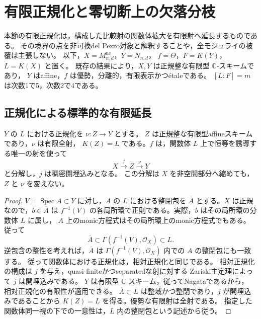 \section{有限正規化と零切断上の欠落分枝}
\label{sec:finite-normalization-boundary}

本節の有限正規化は，構成した比較射の関数体拡大を有限射へ延長するものである。
その境界の点を非可換del Pezzo対象と解釈することや，全モジュライの被覆は主張しない。
以下，$X=M^{\mathrm{nc}}_{n,d}$，$Y=N_{n,d}$，
$f=\overline\Theta$，$F=K(Y)$，$L=K(X)$ と置く。
既存の結果により，$X,Y$ は正規整な有限型 $\mathbb C$-スキームであり，
$Y$ はaffine，$f$ は優勢，分離的，有限表示かつ\'{e}taleである。
$[L:F]=m$ は次数1で5，次数2で4である。

\subsection{正規化による標準的な有限延長}

\begin{proposition}[有限正規化への開埋込み]
\label{prop:finite-normalization-open}
$Y$ の $L$ における正規化を $\nu:Z\to Y$ とする。
$Z$ は正規整な有限型affineスキームであり，$\nu$ は有限全射，
$K(Z)=L$ である。$f$ は，関数体 $L$ 上で恒等を誘導する唯一の射を使って
\[
 X\xrightarrow{\ j\ }Z\xrightarrow{\ \nu\ }Y
\]
と分解し，$j$ は稠密開埋込みとなる。
この分解は $X$ を非空開部分へ縮めても，$Z$ と $\nu$ を変えない。
\end{proposition}
\begin{proof}
$V=\operatorname{Spec}A\subset Y$ に対し，$A$ の $L$ における整閉包を
$\overline A$ とする。$X$ は正規なので，$b\in\overline A$ は
$f^{-1}(V)$ の各局所環で正則である。実際，$b$ はその局所環の分数体 $L$ に属し，
$A$ 上のmonic方程式はその局所環上のmonic方程式でもある。
従って
\[
 \overline A\subset\Gamma(f^{-1}(V),\mathcal O_X)\subset L.
\]
逆包含の整性を考えれば，$\overline A$ は
$\Gamma(f^{-1}(V),\mathcal O_X)$ 内での $A$ の整閉包にも一致する。
従って関数体における正規化は，相対正規化と同じである。
相対正規化の構成は $j$ を与え，quasi-finiteかつseparatedな射に対する
Zariski主定理\cite[Tag 02LR]{StacksProject}によって $j$ は開埋込みである。
$Y$ は有限型 $\mathbb C$-スキーム，従ってNagataであるから，
相対正規化の有限性\cite[Tag 03GR]{StacksProject}が適用できる。
$\overline A\subset L$ は整域かつ整閉であり，$j$ が開埋込みであることから
$K(Z)=L$ を得る。優勢な有限射は全射である。
指定した関数体同一視の下での一意性は，$L$ 内の整閉包という記述から従う。
\end{proof}

